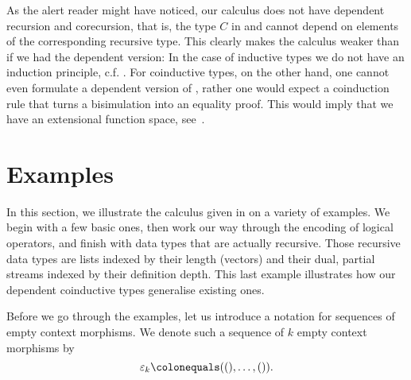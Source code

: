 \documentclass[preprint]{sigplanconf}
\begin{document}
\begin{remark}
  \label{rem:no-induction}
  As the alert reader might have noticed, our calculus does not have dependent
  recursion and corecursion, that is, the type $C$ in  and
   cannot depend on elements of the corresponding recursive
  type.
  This clearly makes the calculus weaker than if we had the dependent
  version:
  In the case of inductive types we do not have an induction principle,
  c.f. .
  For coinductive types, on the other hand, one cannot even formulate a
  dependent version of , rather one would expect a
  coinduction rule that turns a bisimulation into an equality proof.
  This would imply that we have an extensional function space,
  see~.
\end{remark}

 \section{Examples}
\label{sec:examples}

In this section, we illustrate the calculus given in  on
a variety of examples.
We begin with a few basic ones, then work our way through the encoding of
logical operators, and finish with data types that are actually recursive.
Those recursive data types are lists indexed by their length (vectors) and
their dual, partial streams indexed by their definition depth.
This last example illustrates how our dependent coinductive types
generalise existing ones.

Before we go through the examples, let us introduce a notation for sequences of
empty context morphisms.
We denote such a sequence of $k$ empty context morphisms by
\begin{equation*}
  \varepsilon_k \colonequals ((), \dotsc, ()).
\end{equation*}
\end{document}
